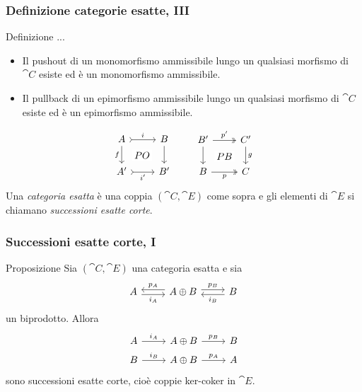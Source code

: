\documentclass{beamer}
\begin{document}
\begin{frame}[fragile]
  \frametitle{Definizione categorie esatte, III}

  \begin{block}{Definizione}
    ...
    \begin{itemize}
    \item \label{item:E2} Il pushout di un monomorfismo ammissibile
      lungo un qualsiasi morfismo di \(\cat C\) esiste ed è un
      monomorfismo ammissibile.
    \item \label{item:E2op} Il pullback di un epimorfismo ammissibile
      lungo un qualsiasi morfismo di \(\cat C\) esiste ed è un
      epimorfismo ammissibile.
    \end{itemize}
    \[
      \begin{tikzcd}
        A \ar["{f}", d, swap] \ar["{PO}" description, dr, phantom] \ar["{i}", rightarrowtail, r] & B \ar["{}", d] \\
        A' \ar["{i'}", rightarrowtail, r, swap] & B'
      \end{tikzcd}
      \qquad
      \begin{tikzcd}
        B' \ar["{}", d] \ar["{PB}" description, dr, phantom] \ar["{p'}", twoheadrightarrow, r] & C' \ar["{g}", d] \\
        B \ar["{p}", twoheadrightarrow, r, swap] & C
      \end{tikzcd}
    \]
    Una {\em categoria esatta} è una coppia \((\cat C,\cat E)\) come
    sopra e gli elementi di \(\cat E\) si chiamano {\em successioni
      esatte corte}.
  \end{block}
  
\end{frame}

\begin{frame}[fragile]
  \frametitle{Successioni esatte corte, I}
  
  \begin{block}{Proposizione}
    Sia \((\cat C,\cat E)\) una categoria esatta e sia
    \[
      \begin{tikzcd}
        A \ar["{i_A}", r, shift right, swap] & A \oplus B \ar["{p_A}",
        l, shift right, swap] \ar["{p_B}", r, shift left] & B
        \ar["{i_B}", l, shift left]
      \end{tikzcd}
    \]
    un biprodotto. Allora
    \[
      \begin{tikzcd}[row sep=tiny]
        A \ar["{i_A}", r] & A \oplus B \ar["{p_B}", r] & B \\
        B \ar["{i_B}", r] & A \oplus B \ar["{p_A}", r] & A
      \end{tikzcd}
    \]
    sono successioni esatte corte, cioè coppie ker-coker in \(\cat E\).
  \end{block}
  
\end{frame}
\end{document}
